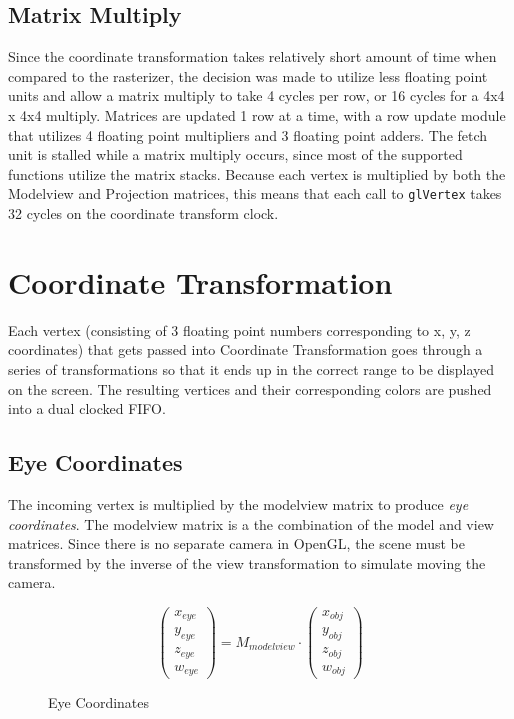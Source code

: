 \documentclass[letterpaper,10pt]{article}
\begin{document}
\subsection{Matrix Multiply}
Since the coordinate transformation takes relatively short amount of time when compared to the rasterizer, the decision was made to utilize less floating point units and allow a matrix multiply to take 4 cycles per row, or 16 cycles for a 4x4 x 4x4 multiply. Matrices are updated 1 row at a time, with a row update module that utilizes 4 floating point multipliers and 3 floating point adders. The fetch unit is stalled while a matrix multiply occurs, since most of the supported functions utilize the matrix stacks. Because each vertex is multiplied by both the Modelview and Projection matrices, this means that each call to \verb!glVertex! takes 32 cycles on the coordinate transform clock.



\section{Coordinate Transformation}
Each vertex (consisting of 3 floating point numbers corresponding to x, y, z coordinates) that gets passed into Coordinate Transformation goes through a series of transformations so that it ends up in the correct range to be displayed on the screen. The resulting vertices and their corresponding colors are pushed into a dual clocked FIFO.

\subsection{Eye Coordinates}
The incoming vertex is multiplied by the modelview matrix to produce \emph{eye coordinates}. The modelview matrix is a the combination of the model and view matrices. Since there is no separate camera in OpenGL, the scene must be transformed by the inverse of the view transformation to simulate moving the camera.\\

\begin{figure}[h]
\[
\begin{pmatrix}
x_{eye} \\
y_{eye} \\
z_{eye} \\
w_{eye}
\end{pmatrix}
= M_{modelview} \cdot
\begin{pmatrix}
x_{obj} \\
y_{obj} \\
z_{obj} \\
w_{obj}
\end{pmatrix}
\]
\caption{Eye Coordinates}
\end{figure}
\end{document}
